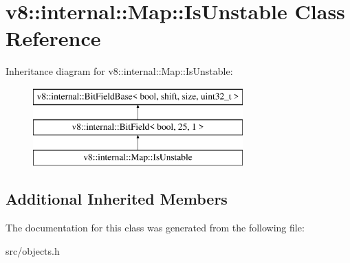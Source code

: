 \hypertarget{classv8_1_1internal_1_1_map_1_1_is_unstable}{}\section{v8\+:\+:internal\+:\+:Map\+:\+:Is\+Unstable Class Reference}
\label{classv8_1_1internal_1_1_map_1_1_is_unstable}
Inheritance diagram for v8\+:\+:internal\+:\+:Map\+:\+:Is\+Unstable\+:\begin{figure}[H]
\begin{center}
\leavevmode
\includegraphics[height=3.000000cm]{classv8_1_1internal_1_1_map_1_1_is_unstable}
\end{center}
\end{figure}
\subsection*{Additional Inherited Members}


The documentation for this class was generated from the following file\+:\begin{DoxyCompactItemize}
\item 
src/objects.\+h\end{DoxyCompactItemize}
